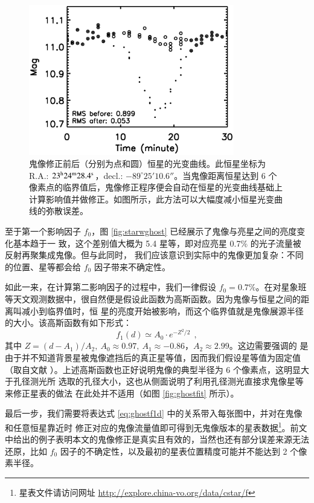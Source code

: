 \begin{figure}[ht!]
\centering
\includegraphics[width=0.8\textwidth, trim={0.5cm 0.3cm 0.5cm 0}]{figures/chapter2/f10_deghost.eps}
\caption{鬼像修正前后（分别为点和圆）恒星的光变曲线。此恒星坐标为 R.A.: $23^\mathrm{h}24^\mathrm{m}28.4^\mathrm{s}$，decl.: $-89^{\circ}25'10.6''$。当鬼像距离恒星达到 6 个像素点的临界值后，鬼像修正程序便会自动在恒星的光变曲线基础上计算影响值并做修正。如图所示，此方法可以大幅度减小恒星光变曲线的弥散误差。}
\label{fig:deghost}
\end{figure}


至于第一个影响因子 $f_0$，图 \ref{fig:starwghost} 已经展示了鬼像与亮星之间的亮度变化基本趋于一
致，这个差别值大概为 5.4 星等，即对应亮星 0.7\% 的光子流量被反射再聚集成鬼像。但与此同时，
我们应该意识到实际中的鬼像更加复杂：不同的位置、星等都会给 $f_0$ 因子带来不确定性。

如此一来，在计算第二影响因子的过程中，我们一律假设 $f_0 =  0.7\% $。在对星象班等天文观测数据中，很自然便是假设此函数为高斯函数。因为鬼像与恒星之间的距离叫减小到临界值时，恒
星的亮度开始被影响，而这个临界值就是鬼像展源半径的大小。该高斯函数有如下形式：
\begin{equation} \label{eq:ghostf1d}
f_1(d) \simeq A_0 \cdot e^{-Z^2/2} \ \ , 
\end{equation} 
其中 $Z = (d-A_1)/A_2,\ A_0 \approx 0.97,\ A_1 \approx -0.86$，$A_2 \approx 2.99$。这边需要强调的
是由于并不知道背景星被鬼像遮挡后的真正星等值，因而我们假设星等值为固定值（取自文献 
）。上述高斯函数也正好说明鬼像的典型半径为 6 个像素点，这明显大于孔径测光所
选取的孔径大小\cite{ZhouX2010b}，这也从侧面说明了利用孔径测光直接求鬼像星等来修正星表的做法
在此处并不适用（如图 \ref{fig:ghostfit} 所示）。

最后一步，我们需要将表达式 \ref{eq:ghostf1d} 中的关系带入每张图中，并对在鬼像和任意恒星靠近时
修正对应的鬼像流量值即可得到无鬼像版本的星表数据\footnote{星表文件请访问网址 \url{http://explore.china-vo.org/data/cstar/f}}。前文中给出的例子表明本文的鬼像修正是真实且有效的，当然也还有部分误差来源无法还原，比如 $f_0$ 因子的不确定性，以及最初的星表位置精度可能并不能达到 2 个像素半径。

